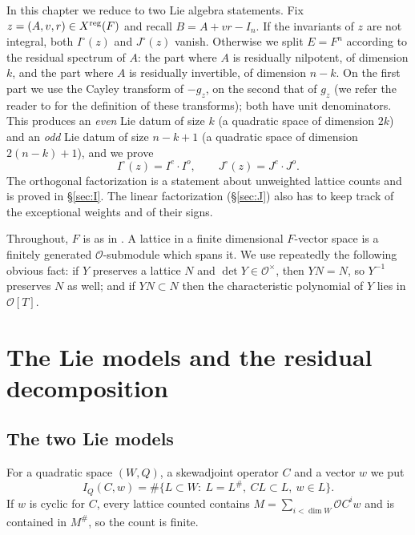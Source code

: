 \documentclass[11pt,oneside,notitlepage]{book}
\numberwithin{equation}{section}
\theoremstyle{plain}
\theoremstyle{definition}
\newcommand{\cO}{\mathcal{O}}
\begin{document}
In this chapter we reduce  to two Lie algebra statements. Fix $z=(A,v,r)\in X^{\rm reg}(F)$ and recall $B=A+vr-I_n$. If the invariants of $z$ are not integral, both $I^\circ(z)$ and $J^\circ(z)$ vanish. Otherwise we split $E=F^n$ according to the residual spectrum of $A$: the part where $A$ is residually nilpotent, of dimension $k$, and the part where $A$ is residually invertible, of dimension $n-k$. On the first part we use the Cayley transform of $-g_z$, on the second that of $g_z$ (we refer the reader to  for the definition of these transforms); both have unit denominators. This produces an \emph{even} Lie datum of size $k$ (a quadratic space of dimension $2k$) and an \emph{odd} Lie datum of size $n-k+1$ (a quadratic space of dimension $2(n-k)+1$), and we prove
\[I^\circ(z)=I^e\cdot I^o,\qquad J^\circ(z)=J^e\cdot J^o .\]
The orthogonal factorization is a statement about unweighted lattice counts and is proved in \S\ref{sec:I}. The linear factorization (\S\ref{sec:J}) also has to keep track of the exceptional weights and of their signs.

Throughout, $F$ is as in . A lattice in a finite dimensional $F$-vector space is a finitely generated $\cO$-submodule which spans it. We use repeatedly the following obvious fact: if $Y$ preserves a lattice $N$ and $\det Y\in\cO^\times$, then $YN=N$, so $Y^{-1}$ preserves $N$ as well; and if $YN\subset N$ then the characteristic polynomial of $Y$ lies in $\cO[T]$.

\section{The Lie models and the residual decomposition}\label{sec:models}

\subsection*{The two Lie models}

For a quadratic space $(W,Q)$, a skewadjoint operator $C$ and a vector $w$ we put
\[I_Q(C,w)=\#\{L\subset W:\ L=L^\#,\ CL\subset L,\ w\in L\}.\]
If $w$ is cyclic for $C$, every lattice counted contains $M=\sum_{i<\dim W}\cO C^iw$ and is contained in $M^\#$, so the count is finite.
\end{document}

